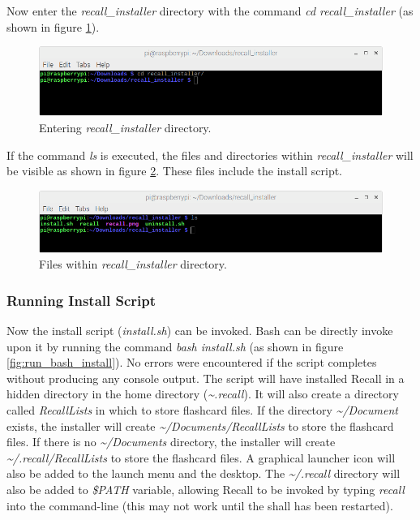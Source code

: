 \documentclass[letterpaper]{article}
\begin{document}
Now enter the \textit{recall\_installer} directory with the command \textit{cd recall\_installer} (as shown in figure \ref{fig:cd_recall_installer}).

\begin{figure}[H]
  \centering
  \includegraphics[width=14cm]{images/command_line_install/enter_recall_installer_folder.png}
  \caption{Entering \textit{recall\_installer} directory.}
  \label{fig:cd_recall_installer}
\end{figure}

If the command \textit{ls} is executed, the files and directories within \textit{recall\_installer} will be visible as shown in figure \ref{fig:files_in_recall_installer}. These files include the install script.

\begin{figure}[H]
  \centering
  \includegraphics[width=14cm]{images/command_line_install/list_files.png}
  \caption{Files within \textit{recall\_installer} directory.}
  \label{fig:files_in_recall_installer}
\end{figure}

\subsubsection{Running Install Script} \label{running install script in terminal}
Now the install script (\textit{install.sh}) can be invoked. Bash can be directly invoke upon it by running the command \textit{bash install.sh} (as shown in figure \ref{fig:run_bash_install}). No errors were encountered if the script completes without producing any console output. The script will have installed Recall in a hidden directory in the home directory (\textit{\~{}.recall}). It will also create a directory called \textit{RecallLists} in which to store flashcard files. If the directory \textit{\~{}/Document} exists, the installer will create \textit{\~{}/Documents/RecallLists} to store the flashcard files. If there is no \textit{\~{}/Documents} directory, the installer will create \textit{\~{}/.recall/RecallLists} to store the flashcard files. A graphical launcher icon will also be added to the launch menu and the desktop. The \textit{\~{}/.recall} directory will also be added to \textit{\$PATH} variable, allowing Recall to be invoked by typing \textit{recall} into the command-line (this may not work until the shall has been restarted).
\end{document}
